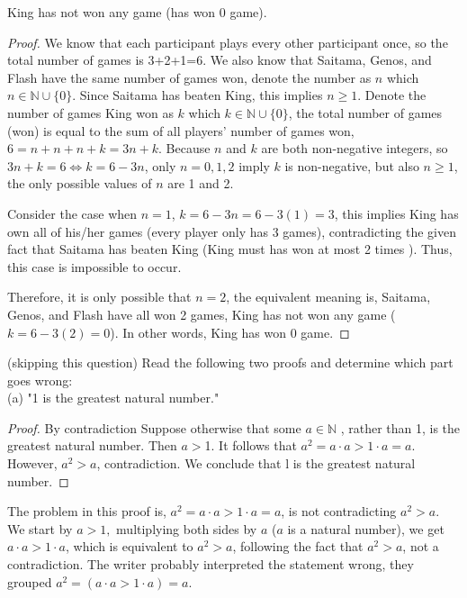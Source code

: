 \documentclass{homework}
\begin{document}
\begin{claim}
    King has not won any game (has won 0 game). 
\end{claim}

\begin{proof}
    We know that each participant plays every other participant once, so the total number of games is 3+2+1=6. We also know that Saitama, Genos, and Flash have the same number of games won, denote the number as $n$ which $n\in\mathbb{N}\cup\{0\}$. Since Saitama has beaten King, this implies $n\geq1$. Denote the number of games King won as $k$ which $k\in\mathbb{N}\cup\{0\}$, the total number of games (won) is equal to the sum of all players' number of games won, $6=n+n+n+k=3n+k$. Because $n$ and $k$ are both non-negative integers, so $3n+k=6 \iff k=6-3n$, only $n=0,1,2$ imply $k$ is non-negative, but also $n\geq1$, the only possible values of $n$ are 1 and 2. 

    Consider the case when $n = 1$, $k=6-3n=6-3(1)=3$, this implies King has own all of his/her games (every player only has 3 games), contradicting the given fact that Saitama has beaten King (King must has won at most 2 times ). Thus, this case is impossible to occur.

    Therefore, it is only possible that $n = 2$, the equivalent meaning is, Saitama, Genos, and Flash have all won 2 games, King has not won any game ($k=6-3(2)=0$).  In other words, King has won 0 game.
\end{proof}

\newpage
\question (skipping this question) Read the following two proofs and determine which part goes wrong:\\

(a) "1 is the greatest natural number."

\begin{proof}
    By contradiction Suppose otherwise that some $a\in\mathbb{N}$ , rather than 1, is the greatest natural number. Then $a> $1. It follows that $a^2=a\cdot a>1\cdot a=a$. However, $a^2>a$, contradiction. We conclude that l is the greatest natural number.
\end{proof}
The problem in this proof is, $a^2=a\cdot a > 1\cdot a = a$, is not contradicting $a^2>a$. We start by $a>1,$ multiplying both sides by $a$ ($a$ is a natural number), we get $a\cdot a>1\cdot a$, which is equivalent to $a^2>a$, following the fact that $a^2>a$, not a contradiction. The writer probably interpreted the statement wrong, they grouped $a^2=(a\cdot a > 1\cdot a) = a$. 
\end{document}
